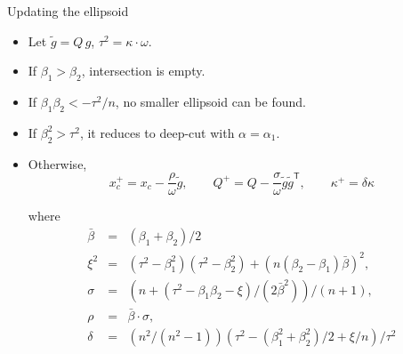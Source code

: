 \documentclass[10pt,ignorenonframetext,serif,onlymath]{beamer}
\begin{document}
\begin{frame}{Updating the ellipsoid}
\protect\hypertarget{updating-the-ellipsoid}{}

\begin{itemize}
\item
  Let \(\tilde{g} = Q\,g\), \(\tau^2 = \kappa\cdot\omega\).
\item
  If \(\beta_1 > \beta_2\), intersection is empty.
\item
  If \(\beta_1 \beta_2 < -\tau^2/n\), no smaller ellipsoid can be found.
\item
  If \(\beta_2^2 > \tau^2\), it reduces to deep-cut with
  \(\alpha = \alpha_1\).
\item
  Otherwise, \[x_c^+ = x_c - \frac{\rho}{\omega} \tilde{g}, \qquad
  Q^+ = Q - \frac{\sigma}{\omega} \tilde{g}\tilde{g}^\mathsf{T}, \qquad
  \kappa^+ =  \delta \kappa
   \]

  where \[\begin{array}{lll}
    \bar{\beta} &=& (\beta_1 + \beta_2)/2 \\
    \xi^2 &=& (\tau^2 - \beta_1^2)(\tau^2 - \beta_2^2) + (n(\beta_2 - \beta_1)\bar{\beta})^2, \\
    \sigma &=& (n + (\tau^2 - \beta_1\beta_2 - \xi)/(2\bar{\beta}^2)) / (n + 1), \\
    \rho &=& \bar{\beta}\cdot\sigma, \\
    \delta &=& (n^2/(n^2-1)) (\tau^2 - (\beta_1^2 + \beta_2^2)/2 + \xi/n) / \tau^2
   \end{array}\]
\end{itemize}

\end{frame}
\end{document}
